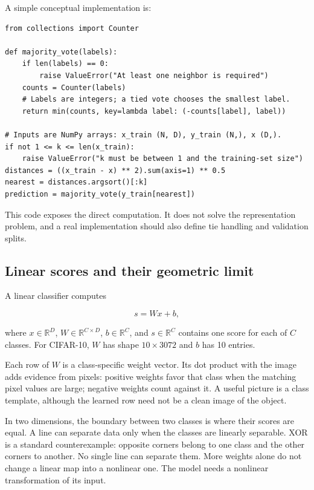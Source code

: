A simple conceptual implementation is:

\begin{verbatim}
from collections import Counter

def majority_vote(labels):
    if len(labels) == 0:
        raise ValueError("At least one neighbor is required")
    counts = Counter(labels)
    # Labels are integers; a tied vote chooses the smallest label.
    return min(counts, key=lambda label: (-counts[label], label))

# Inputs are NumPy arrays: x_train (N, D), y_train (N,), x (D,).
if not 1 <= k <= len(x_train):
    raise ValueError("k must be between 1 and the training-set size")
distances = ((x_train - x) ** 2).sum(axis=1) ** 0.5
nearest = distances.argsort()[:k]
prediction = majority_vote(y_train[nearest])
\end{verbatim}

This code exposes the direct computation. It does not solve the representation problem, and a real implementation should also define tie handling and validation splits.

\subsection{Linear scores and their geometric limit}\label{04-visual-computing-ii-ch031-linear-scores-and-their-geometric-limit}

A linear classifier computes

\[s=Wx+b,\]

where \(x\in\mathbb{R}^{D}\), \(W\in\mathbb{R}^{C\times D}\), \(b\in\mathbb{R}^{C}\), and \(s\in\mathbb{R}^{C}\) contains one score for each of \(C\) classes. For CIFAR-10, \(W\) has shape \(10\times3072\) and \(b\) has 10 entries.

Each row of \(W\) is a class-specific weight vector. Its dot product with the image adds evidence from pixels: positive weights favor that class when the matching pixel values are large; negative weights count against it. A useful picture is a class template, although the learned row need not be a clean image of the object.

In two dimensions, the boundary between two classes is where their scores are equal. A line can separate data only when the classes are linearly separable. XOR is a standard counterexample: opposite corners belong to one class and the other corners to another. No single line can separate them. More weights alone do not change a linear map into a nonlinear one. The model needs a nonlinear transformation of its input.

